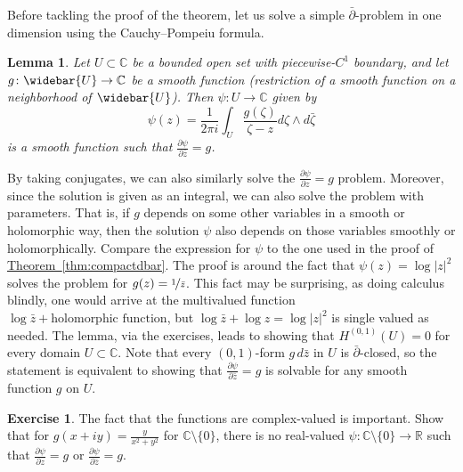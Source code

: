 \documentclass[12pt,openany]{book}
\newcommand{\sabs}[1]{\lvert {#1} \rvert}
\newcommand{\C}{{\mathbb{C}}}
\newcommand{\R}{{\mathbb{R}}}
\theoremstyle{plain}
\newtheorem{lemma}[thm]{Lemma}
\theoremstyle{remark}
\theoremstyle{definition}
\newenvironment{exbox}{%
    \def\FrameCommand{\vrule width 1pt \relax\hspace{10pt}}%
    \MakeFramed{\advance\hsize-\width\FrameRestore}%
}{%
    \endMakeFramed
}
\theoremstyle{exercise}
\newtheorem{exercise}{Exercise}[section]
\theoremstyle{example}
\newcommand{\thmref}[1]{\hyperref[#1]{Theorem~\ref*{#1}}}
\begin{document}
Before tackling the proof of the theorem, let us
solve a simple $\bar{\partial}$-problem in one dimension
using the Cauchy--Pompeiu formula.

\begin{lemma} \label{lemma:dbaronevar}
Let $U \subset \C$ be a bounded open set with piecewise-$C^1$ boundary,
and let $g \colon \widebar{U} \to \C$ be a smooth function (restriction of a
smooth function on a neighborhood of $\widebar{U}$).
Then $\psi \colon U \to \C$ given by
\begin{equation*}
\psi(z) =
\frac{1}{2\pi i} \int_U \frac{g(\zeta)}{\zeta-z} d\zeta \wedge d\bar{\zeta}
\end{equation*}
is a smooth function such that $\frac{\partial \psi}{\partial \bar{z}} = g$.
\end{lemma}

By taking conjugates, we can also similarly solve the
$\frac{\partial \psi}{\partial z} = g$ problem.  Moreover, since the
solution is given as an integral, we can also solve the problem with
parameters.  That is, if $g$ depends on some other variables in a smooth or
holomorphic way, then the solution $\psi$ also depends on those variables
smoothly or holomorphically.
Compare the expression for $\psi$ to the one used in the proof of
\thmref{thm:compactdbar}.
The proof is around the fact that $\psi(z) = \log \sabs{z}^2$
solves the problem for $g(z) = \nicefrac{1}{\bar{z}}$.
This fact may be surprising, as doing calculus blindly, one would arrive
at the multivalued function $\log \bar{z} + \text{holomorphic function}$,
but $\log \bar{z} + \log z = \log \sabs{z}^2$ is single valued as needed.
The lemma, via the exercises, leads to showing that $H^{(0,1)}(U) = 0$ for
every domain $U \subset \C$.  Note that every $(0,1)$-form
$g \, d\bar{z}$ in $U$ is $\bar{\partial}$-closed, so the statement is
equivalent to showing that $\frac{\partial \psi}{\partial \bar{z}} = g$
is solvable for any smooth function $g$ on $U$.

\begin{exbox}
\begin{exercise}
The fact that the functions are complex-valued is important.  Show that
for $g(x+iy) = \frac{y}{x^2+y^2}$ for $\C \setminus \{ 0 \}$,
there is no real-valued $\psi \colon \C \setminus \{ 0 \} \to \R$
such that
$\frac{\partial \psi}{\partial z} = g$ or
$\frac{\partial \psi}{\partial \bar{z}} = g$.
\end{exercise}
\end{exbox}
\end{document}
